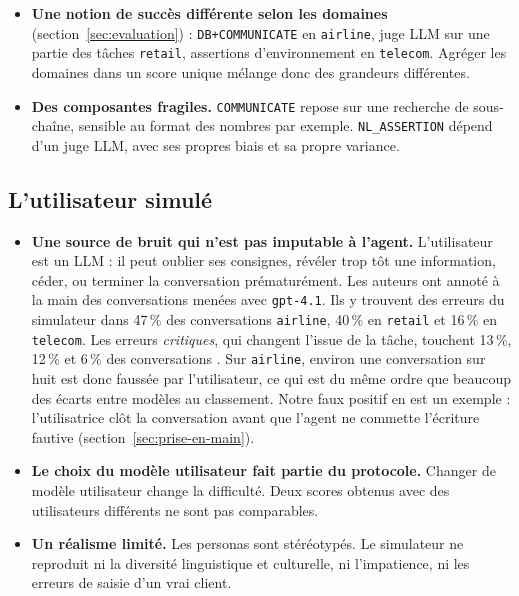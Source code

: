 \begin{itemize}
  \item \textbf{Une notion de succès différente selon les domaines} (section~\ref{sec:evaluation}) : \texttt{DB+COMMUNICATE} en \texttt{airline}, juge LLM sur une partie des tâches \texttt{retail}, assertions d'environnement en \texttt{telecom}. Agréger les domaines dans un score unique mélange donc des grandeurs différentes.
  \item \textbf{Des composantes fragiles.} \texttt{COMMUNICATE} repose sur une recherche de sous-chaîne, sensible au format des nombres par exemple. \texttt{NL\_ASSERTION} dépend d'un juge LLM, avec ses propres biais et sa propre variance.
\end{itemize}

\subsection{L'utilisateur simulé}
\begin{itemize}
  \item \textbf{Une source de bruit qui n'est pas imputable à l'agent.} L'utilisateur est un LLM : il peut oublier ses consignes, révéler trop tôt une information, céder, ou terminer la conversation prématurément. Les auteurs ont annoté à la main des conversations menées avec \texttt{gpt-4.1}. Ils y trouvent des erreurs du simulateur dans 47\,\% des conversations \texttt{airline}, 40\,\% en \texttt{retail} et 16\,\% en \texttt{telecom}. Les erreurs \emph{critiques}, qui changent l'issue de la tâche, touchent 13\,\%, 12\,\% et 6\,\% des conversations \cite{barres2025tau2}. Sur \texttt{airline}, environ une conversation sur huit est donc faussée par l'utilisateur, ce qui est du même ordre que beaucoup des écarts entre modèles au classement. Notre faux positif en est un exemple : l'utilisatrice clôt la conversation avant que l'agent ne commette l'écriture fautive (section~\ref{sec:prise-en-main}).
  \item \textbf{Le choix du modèle utilisateur fait partie du protocole.} Changer de modèle utilisateur change la difficulté. Deux scores obtenus avec des utilisateurs différents ne sont pas comparables.
  \item \textbf{Un réalisme limité.} Les personas sont stéréotypés. Le simulateur ne reproduit ni la diversité linguistique et culturelle, ni l'impatience, ni les erreurs de saisie d'un vrai client.
\end{itemize}

